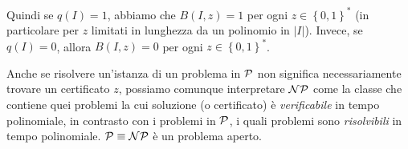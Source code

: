 Quindi se $q(I) = 1$, abbiamo che $B(I,z) = 1$ per ogni $z \in \left\{0,1\right\}^\ast$ (in particolare per $z$ limitati in lunghezza da un polinomio in $|I|$). Invece, se $q(I) = 0$, allora $B(I,z) = 0$ per ogni $z \in \left\{0,1\right\}^\ast$.

Anche se risolvere un'istanza di un problema in $\P$ non significa necessariamente trovare un certificato $z$, possiamo comunque interpretare $\NP$ come la classe che contiene quei problemi la cui soluzione (o certificato) è \textit{verificabile} in tempo polinomiale, in contrasto con i problemi in $\P$, i quali problemi sono \textit{risolvibili} in tempo polinomiale. $\P \equiv \NP$ è un problema aperto.